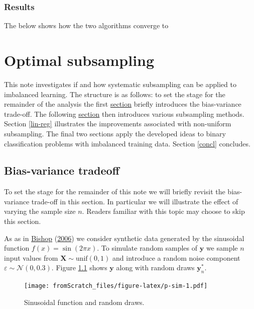 \documentclass[
]{book}
\begin{document}
\hypertarget{results}{%
\subsection{Results}\label{results}}

The below shows how the two algorithms converge to

\hypertarget{optimal-subsampling}{%
\chapter{Optimal subsampling}\label{optimal-subsampling}}

This note investigates if and how systematic subsampling can be applied to imbalanced learning. The structure is as follows: to set the stage for the remainder of the analysis the first \protect\hyperlink{bias}{section} briefly introduces the bias-variance trade-off. The following \protect\hyperlink{subsampling}{section} then introduces various subsampling methods. Section \ref{lin-reg} illustrates the improvements associated with non-uniform subsampling. The final two sections apply the developed ideas to binary classification problems with imbalanced training data. Section \ref{concl} concludes.

\hypertarget{bias}{%
\section{Bias-variance tradeoff}\label{bias}}

To set the stage for the remainder of this note we will briefly revisit the bias-variance trade-off in this section. In particular we will illustrate the effect of varying the sample size \(n\). Readers familiar with this topic may choose to skip this section.

As as in \protect\hyperlink{ref-bishop2006pattern}{Bishop} (\protect\hyperlink{ref-bishop2006pattern}{2006}) we consider synthetic data generated by the sinusoidal function \(f(x)=\sin(2\pi x)\). To simulate random samples of \(\mathbf{y}\) we sample \(n\) input values from \(\mathbf{X} \sim \text{unif}(0,1)\) and introduce a random noise component \(\varepsilon \sim \mathcal{N}(0,0.3)\). Figure \ref{fig:p-sim} shows \(\mathbf{y}\) along with random draws \(\mathbf{y}^*_n\).

\begin{figure}
\centering
\texttt{[image: fromScratch\_files/figure-latex/p-sim-1.pdf]}
\caption{\label{fig:p-sim}Sinusoidal function and random draws.}
\end{figure}
\end{document}

